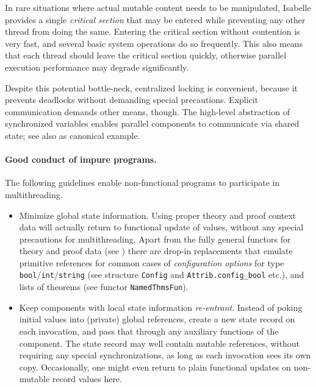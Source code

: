 \begin{isabellebody}
\begin{isamarkuptext}
  \medskip In rare situations where actual mutable content needs to be
  manipulated, Isabelle provides a single \emph{critical section} that
  may be entered while preventing any other thread from doing the
  same.  Entering the critical section without contention is very
  fast, and several basic system operations do so frequently.  This
  also means that each thread should leave the critical section
  quickly, otherwise parallel execution performance may degrade
  significantly.

  Despite this potential bottle-neck, centralized locking is
  convenient, because it prevents deadlocks without demanding special
  precautions.  Explicit communication demands other means, though.
  The high-level abstraction of synchronized variables \hyperlink{file.~~/src/Pure/Concurrent/synchronized.ML}{\mbox{}} enables parallel
  components to communicate via shared state; see also \hyperlink{file.~~/src/Pure/Concurrent/mailbox.ML}{\mbox{}} as canonical example.

  \paragraph{Good conduct of impure programs.} The following
  guidelines enable non-functional programs to participate in
  multithreading.

  \begin{itemize}

  \item Minimize global state information.  Using proper theory and
  proof context data will actually return to functional update of
  values, without any special precautions for multithreading.  Apart
  from the fully general functors for theory and proof data (see
  ) there are drop-in replacements that
  emulate primitive references for common cases of \emph{configuration
  options} for type \verb|bool|/\verb|int|/\verb|string| (see structure \verb|Config| and \verb|Attrib.config_bool| etc.), and lists of theorems (see functor
  \verb|NamedThmsFun|).

  \item Keep components with local state information
  \emph{re-entrant}.  Instead of poking initial values into (private)
  global references, create a new state record on each invocation, and
  pass that through any auxiliary functions of the component.  The
  state record may well contain mutable references, without requiring
  any special synchronizations, as long as each invocation sees its
  own copy.  Occasionally, one might even return to plain functional
  updates on non-mutable record values here.


\end{itemize}
\end{isamarkuptext}
\end{isabellebody}
